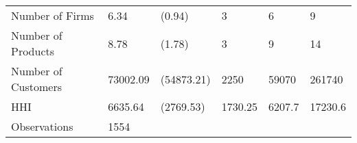 \begin{tabular}[t]{llllll}
\hspace{1em}\hspace{1em}Number of Firms & 6.34 & (0.94) & 3 & 6 & 9\\
\hspace{1em}\hspace{1em}Number of Products & 8.78 & (1.78) & 3 & 9 & 14\\
\hspace{1em}\hspace{1em}Number of Customers & 73002.09 & (54873.21) & 2250 & 59070 & 261740\\
\hspace{1em}\hspace{1em}HHI & 6635.64 & (2769.53) & 1730.25 & 6207.7 & 17230.6\\
\midrule
\hspace{1em}\hspace{1em}Observations & 1554 &  &  &  & \\
\midrule
\bottomrule
\end{tabular}
